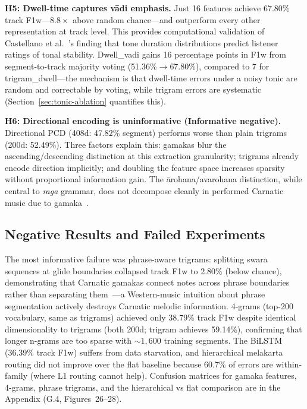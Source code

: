 \documentclass[11pt,a4paper]{article}
\begin{document}
{\textbf{H5: Dwell-time captures v\=adi emphasis.} Just 16 features achieve 67.80\% track F1w---$8.8\times$ above random chance---and outperform every other representation at track level. This provides computational validation of Castellano et al.~\cite{castellano1984}'s finding that tone duration distributions predict listener ratings of tonal stability. Dwell\_vadi gains 16 percentage points in F1w from segment-to-track majority voting (51.36\%$\rightarrow$67.80\%), compared to 7 for trigram\_dwell---the mechanism is that dwell-time errors under a noisy tonic are random and correctable by voting, while trigram errors are systematic (Section~\ref{sec:tonic-ablation} quantifies this).

\textbf{H6: Directional encoding is uninformative (Informative negative).} Directional PCD (408d: 47.82\% segment) performs worse than plain trigrams (200d: 52.49\%). Three factors explain this: gamakas blur the ascending/descending distinction at this extraction granularity; trigrams already encode direction implicitly; and doubling the feature space increases sparsity without proportional information gain. The \=arohana/avarohana distinction, while central to \textit{raga} grammar, does not decompose cleanly in performed Carnatic music due to gamaka~\cite{krishnaswamy2003}.

\subsection{Negative Results and Failed Experiments}
\label{sec:negative}

The most informative failure was phrase-aware trigrams: splitting swara sequences at glide boundaries collapsed track F1w to 2.80\% (below chance), demonstrating that Carnatic gamakas connect notes across phrase boundaries rather than separating them~\cite{krishnaswamy2003}---a Western-music intuition about phrase segmentation actively destroys Carnatic melodic information. 4-grams (top-200 vocabulary, same as trigrams) achieved only 38.79\% track F1w despite identical dimensionality to trigrams (both 200d; trigram achieves 59.14\%), confirming that longer n-grams are too sparse with ${\sim}1{,}600$ training segments. The BiLSTM (36.39\% track F1w) suffers from data starvation, and hierarchical melakarta routing did not improve over the flat baseline because 60.7\% of errors are within-family (where L1 routing cannot help). Confusion matrices for gamaka features, 4-grams, phrase trigrams, and the hierarchical vs flat comparison are in the Appendix (G.4, Figures~26--28).

}
\end{document}
